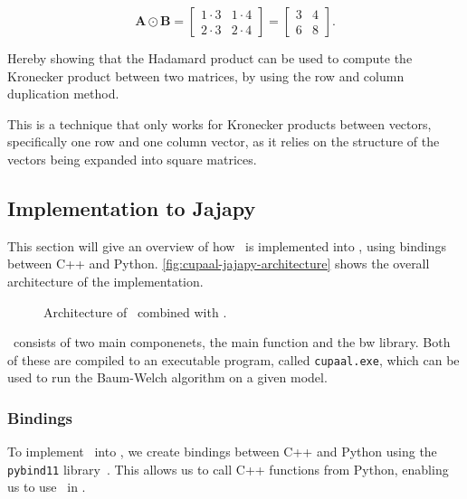 \begin{equation}
    \mathbf{A} \odot \mathbf{B} = \begin{bmatrix}
        1 \cdot 3 & 1 \cdot 4 \\
        2 \cdot 3 & 2 \cdot 4
    \end{bmatrix} = \begin{bmatrix}
        3 & 4 \\
        6 & 8
    \end{bmatrix}.
\end{equation}


Hereby showing that the Hadamard product can be used to compute the Kronecker product between two matrices, by using the row and column duplication method.

This is a technique that only works for Kronecker products between vectors, specifically one row and one column vector, as it relies on the structure of the vectors being expanded into square matrices.

\subsection{Implementation to Jajapy}\label{subsec:implementation-to-jajapy}
This section will give an overview of how \Cupaal\ is implemented into \Jajapy, using bindings between C++ and Python.
\autoref{fig:cupaal-jajapy-architecture} shows the overall architecture of the implementation.

\begin{figure}
    \centering
    
    \caption{Architecture of \Cupaal\ combined with \Jajapy.}
    \label{fig:cupaal-jajapy-architecture}
\end{figure}

\Cupaal\ consists of two main componenets, the main function and the \gls{bw} library.
Both of these are compiled to an executable program, called \texttt{cupaal.exe}, which can be used to run the Baum-Welch algorithm on a given model.

\subsubsection{Bindings}\label{subsubsec:bindings}
To implement \Cupaal\ into \Jajapy, we create bindings between C++ and Python using the \texttt{pybind11} library~\cite{pybind11github}.
This allows us to call C++ functions from Python, enabling us to use \Cupaal\ in \Jajapy.

